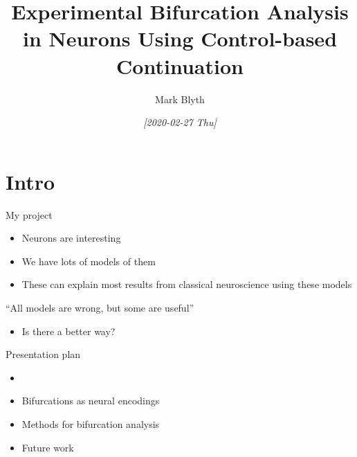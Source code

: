 \documentclass[presentation]{beamer}
\author{Mark Blyth}
\date{\textit{[2020-02-27 Thu]}}
\title{Experimental Bifurcation Analysis in Neurons Using Control-based Continuation}
\begin{document}
\maketitle

\section{Intro}
\label{sec:orgb2f72ad}
\begin{frame}[label={sec:org07772f6}]{My project}
\begin{itemize}
\item Neurons are interesting
\item We have lots of models of them
\item These can explain most results from classical neuroscience using these models
\end{itemize}

\vfill
\begin{exampleblock}{}
  {\large ``All models are wrong, but some are useful''}
  \vskip5mm
  \hspace*{}
\end{exampleblock}
\vfill

\begin{itemize}
\item Is there a better way?
\end{itemize}
\end{frame}

\begin{frame}[label={sec:org0f3a179}]{Presentation plan}
\begin{itemize}
\item \color{bristolred}{A brief introduction to neurons}
\item \color{black} Bifurcations as neural encodings
\item Methods for bifurcation analysis
\item Future work
\end{itemize}
\end{frame}
\end{document}
